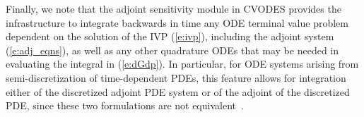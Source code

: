 Finally, we note that the adjoint sensitivity module in CVODES provides the 
infrastructure to integrate backwards in time any ODE terminal value problem
dependent on the solution of the IVP (\ref{e:ivp}), including
the adjoint system (\ref{e:adj_eqns}), as well as any other
quadrature ODEs that may be needed in evaluating the integral in (\ref{e:dGdp}).
In particular, for ODE systems arising from semi-discretization
of time-dependent PDEs, this feature allows for integration either of the 
discretized adjoint PDE system or of the adjoint of the discretized PDE,
since these two formulations are not equivalent~\cite{ArSa:97,LiPe:04}.
